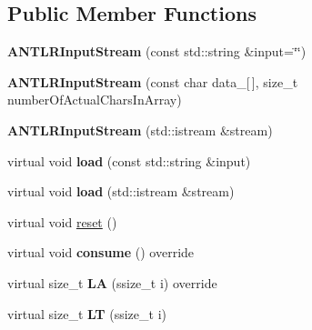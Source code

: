 \subsection*{Public Member Functions}
\begin{DoxyCompactItemize}
\item 
\mbox{\label{classantlr4_1_1ANTLRInputStream_a94e7ae64a3b2d80f911fdb81807efd74}} 
{\bfseries A\+N\+T\+L\+R\+Input\+Stream} (const std\+::string \&input=\char`\"{}\char`\"{})
\item 
\mbox{\label{classantlr4_1_1ANTLRInputStream_aba79908d868c1cd00081885d8ff968e7}} 
{\bfseries A\+N\+T\+L\+R\+Input\+Stream} (const char data\+\_\+\mbox{[}$\,$\mbox{]}, size\+\_\+t number\+Of\+Actual\+Chars\+In\+Array)
\item 
\mbox{\label{classantlr4_1_1ANTLRInputStream_aef56607c326c48eebce3bf7202608240}} 
{\bfseries A\+N\+T\+L\+R\+Input\+Stream} (std\+::istream \&stream)
\item 
\mbox{\label{classantlr4_1_1ANTLRInputStream_ae962ece9c34a19c1aeb5100ccab8b81a}} 
virtual void {\bfseries load} (const std\+::string \&input)
\item 
\mbox{\label{classantlr4_1_1ANTLRInputStream_a5806e604d09aaffa6a0d818024c30484}} 
virtual void {\bfseries load} (std\+::istream \&stream)
\item 
virtual void \hyperlink{classantlr4_1_1ANTLRInputStream_a3bb10995cd48f3fe06f6399a43d4bbb9}{reset} ()
\item 
\mbox{\label{classantlr4_1_1ANTLRInputStream_a8edddb1d103e27801c98211acf482f67}} 
virtual void {\bfseries consume} () override
\item 
\mbox{\label{classantlr4_1_1ANTLRInputStream_afa8fc0a6689cc0ce807dfc06c89bae9d}} 
virtual size\+\_\+t {\bfseries LA} (ssize\+\_\+t i) override
\item 
\mbox{\label{classantlr4_1_1ANTLRInputStream_ad7f3adaa1b600c90f0f59531ef4b75a1}} 
virtual size\+\_\+t {\bfseries LT} (ssize\+\_\+t i)

\end{DoxyCompactItemize}
